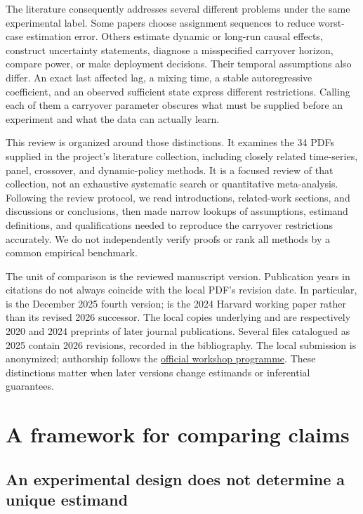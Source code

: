 \documentclass[12pt]{article}
\begin{document}
The literature consequently addresses several different problems under the same experimental label. Some papers choose assignment sequences to reduce worst-case estimation error. Others estimate dynamic or long-run causal effects, construct uncertainty statements, diagnose a misspecified carryover horizon, compare power, or make deployment decisions. Their temporal assumptions also differ. An exact last affected lag, a mixing time, a stable autoregressive coefficient, and an observed sufficient state express different restrictions. Calling each of them a carryover parameter obscures what must be supplied before an experiment and what the data can actually learn.

This review is organized around those distinctions. It examines the 34 PDFs supplied in the project's literature collection, including closely related time-series, panel, crossover, and dynamic-policy methods. It is a focused review of that collection, not an exhaustive systematic search or quantitative meta-analysis. Following the review protocol, we read introductions, related-work sections, and discussions or conclusions, then made narrow lookups of assumptions, estimand definitions, and qualifications needed to reproduce the carryover restrictions accurately. We do not independently verify proofs or rank all methods by a common empirical benchmark.

The unit of comparison is the reviewed manuscript version. Publication years in citations do not always coincide with the local PDF's revision date. In particular, \citet{huwager2025} is the December 2025 fourth version; \citet{nipanel2024} is the 2024 Harvard working paper rather than its revised 2026 successor. The local copies underlying \citet{basse2023} and \citet{liangrecht2025} are respectively 2020 and 2024 preprints of later journal publications. Several files catalogued as 2025 contain 2026 revisions, recorded in the bibliography. The local \citet{ni2022} submission is anonymized; authorship follows the \href{https://sites.google.com/view/caudyn2022/accepted-papers}{official workshop programme}. These distinctions matter when later versions change estimands or inferential guarantees.

\section{A framework for comparing claims}\label{sec:framework}

\subsection{An experimental design does not determine a unique estimand}
\end{document}
